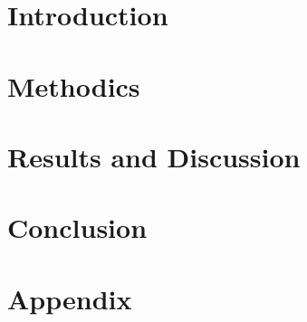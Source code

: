\documentclass[10pt]{article}
\begin{document}
\section*{Introduction}


	
\section*{Methodics}


\section*{Results and Discussion}


\section*{Conclusion}

\renewcommand\refname{Bibliography}
	
	 


\section*{Appendix}
\end{document}
